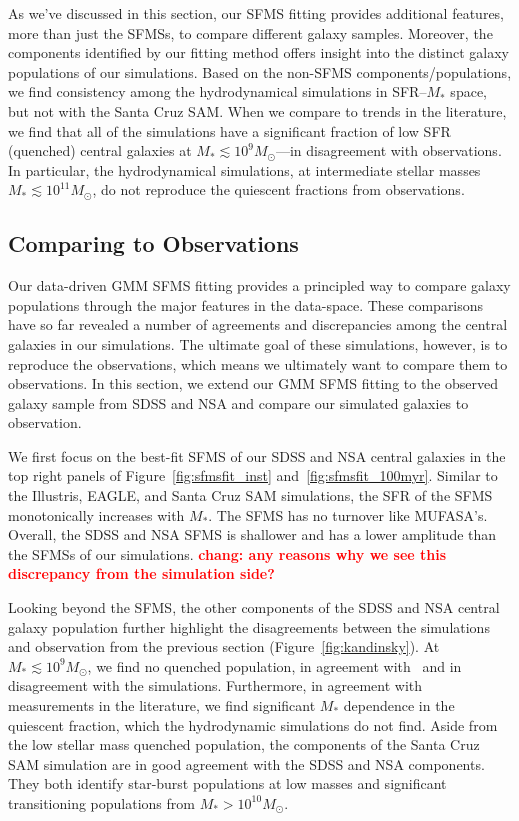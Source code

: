 \documentclass[preprint2,tighten]{aastex62}
\newcommand{\todo}[1]{{\bf \textcolor{red}{ #1}}}
\begin{document}
As we've discussed in this section, our SFMS fitting provides additional 
features, more than just the SFMSs, to compare different galaxy samples.
Moreover, the components identified by our fitting method offers insight
into the distinct galaxy populations of our simulations. Based on the 
non-SFMS components/populations, we find consistency among the hydrodynamical
simulations in SFR--$M_*$ space, but not with the Santa Cruz SAM. When we
compare to trends in the literature, we find that all of the simulations 
have a significant fraction of low SFR (quenched) central galaxies at 
$M_* \lesssim 10^9M_\odot$---in disagreement with observations. In particular, 
the hydrodynamical simulations, at intermediate stellar masses 
$M_* \lesssim 10^{11}M_\odot$, do not reproduce the quiescent fractions from 
observations. 

\subsection{Comparing to Observations}
Our data-driven GMM SFMS fitting provides a principled way to compare 
galaxy populations through the major features in the data-space. These 
comparisons have so far revealed a number of agreements and discrepancies
among the central galaxies in our simulations. The ultimate goal of 
these simulations, however, is to reproduce the observations, which means
we ultimately want to compare them to observations. In this section, we 
extend our GMM SFMS fitting to the observed galaxy sample from SDSS and NSA
and compare our simulated galaxies to observation.

We first focus on the best-fit SFMS of our SDSS and NSA central galaxies
in the top right panels of Figure~\ref{fig:sfmsfit_inst} and~\ref{fig:sfmsfit_100myr}. 
Similar to the Illustris, EAGLE, and Santa Cruz SAM simulations, the SFR of 
the SFMS monotonically increases with $M_*$. The SFMS has no turnover like
MUFASA's. Overall, the SDSS and NSA SFMS is shallower and has a lower amplitude 
than the SFMSs of our simulations. \todo{chang: any reasons why we see this 
discrepancy from the simulation side?}

Looking beyond the SFMS, the other components of the SDSS and NSA central 
galaxy population further highlight the disagreements between the 
simulations and observation from the previous section (Figure~\ref{fig:kandinsky}). 
At $M_* \lesssim 10^9M_\odot$, we find no quenched population, in agreement 
with~\cite{geha2012} and in disagreement with the simulations. Furthermore, 
in agreement with measurements in the literature, we find significant $M_*$
dependence in the quiescent fraction, which the hydrodynamic simulations do 
not find. Aside from the low stellar mass quenched population, the components 
of the Santa Cruz SAM simulation are in good agreement with the SDSS and NSA 
components. They both identify star-burst populations at low masses and 
significant transitioning populations from $M_* > 10^{10}M_\odot$.  
\end{document}
